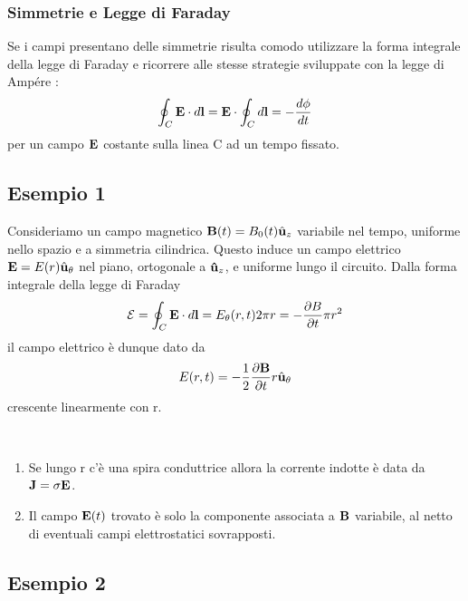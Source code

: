 \subsubsection{Simmetrie e Legge di Faraday}
Se i campi presentano delle simmetrie risulta comodo utilizzare la forma integrale della legge di Faraday e ricorrere alle stesse strategie sviluppate con la legge di Amp\'ere :
\begin{equation*}
	\oint_{C} \bold{E} \cdot d\bold{l} = \bold{E} \cdot \oint_{C}d\bold{l} = - \frac{d \phi}{dt}
\end{equation*}
per un campo $\bold{E}$ costante sulla linea C ad un tempo fissato.
\subsection{Esempio 1 }

Consideriamo un campo magnetico $\bold{B}(t) = B_0(t) \hat{\bold{u}}_z$ variabile nel tempo, uniforme nello spazio e a simmetria cilindrica. Questo induce un campo elettrico $\bold{E}= E(r) \hat{\bold{u}}_{\theta}$ nel piano,  ortogonale a $\bold{\hat{u}}_z$, e uniforme lungo il circuito. Dalla forma integrale della legge di Faraday
\begin{equation*}
	\mathcal{E} = \oint_{C} \bold{E} \cdot d \bold{l} = E_{\theta}(r,t) 2 \pi r = - \frac{\partial B}{\partial t} \pi r^2 
\end{equation*}
il campo elettrico  \`e dunque dato da 
\begin{equation*}
	E(r,t) = - \frac{1}{2} \frac{\partial \bold{B}}{\partial t} r \hat{\bold{u}}_{\theta} 
\end{equation*}
crescente linearmente con r.

\begin{remark}
\
\begin{enumerate}
	\item Se lungo r c'\`e una spira conduttrice 	 allora la corrente indotte \`e data da $\bold{J} = \sigma \bold{E}$.
	\item Il campo $\bold{E}(t)$ trovato \`e solo la componente associata a $\bold{B}$ variabile, al netto di eventuali campi elettrostatici sovrapposti.
\end{enumerate}
\end{remark}

\subsection{Esempio 2}

